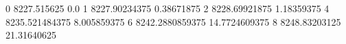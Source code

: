 0 8227.515625 0.0
1 8227.90234375 0.38671875
2 8228.69921875 1.18359375
4 8235.521484375 8.005859375
6 8242.2880859375 14.7724609375
8 8248.83203125 21.31640625
